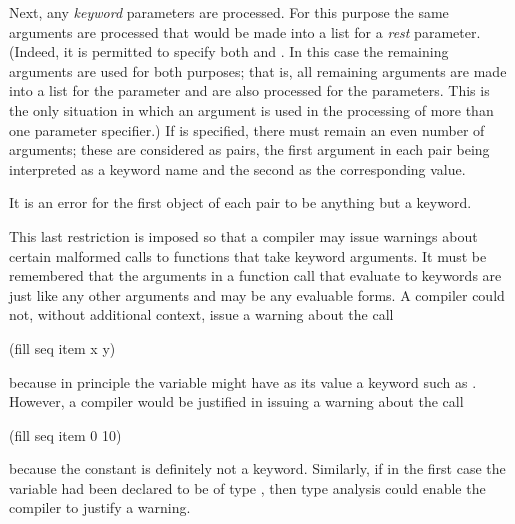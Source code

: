 Next, any {\it keyword} parameters are processed.
For this purpose the same arguments are processed that
would be made into a list for a {\it rest} parameter.
(Indeed, it is permitted to specify both  and .
In this case the remaining arguments are used for both purposes;
that is, all remaining arguments are made into a list for the
 parameter and are also processed for the  parameters.
This is the only situation in which an argument is used
in the processing of more than one parameter specifier.)
If  is specified, there must remain
an even number of arguments; these are considered as pairs,
the first argument in each pair being interpreted as a keyword name
and the second as the corresponding value.
\begin{obsolete}
It is an error for the first object of each pair to be
anything but a keyword.

\beforenoterule
\begin{rationale}
This last restriction is imposed so that a compiler may
issue warnings about certain malformed calls to functions
that take keyword arguments.  It must be remembered that the
arguments in a function call that evaluate to keywords are just
like any other arguments and may be any evaluable forms.
A compiler could not, without additional context, issue a warning
about the call
\begin{lisp}
(fill seq item x y)
\end{lisp}
because in principle the variable  might have as its value a keyword
such as .  However, a compiler would be justified in issuing
a warning about the call
\begin{lisp}
(fill seq item 0 10)
\end{lisp}
because the constant  is definitely not a keyword.  Similarly,
if in the first case the variable  had been declared to be
of type , then type analysis could enable the compiler
to justify a warning.
\end{rationale}
\afternoterule
\end{obsolete}

